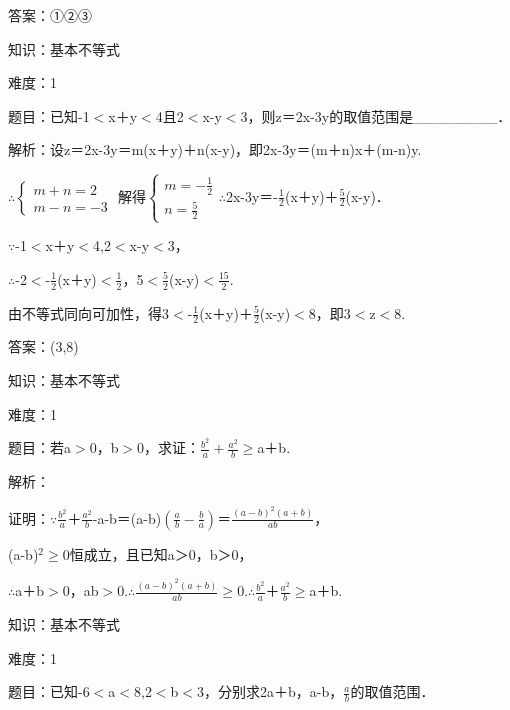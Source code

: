 \documentclass{article} %
\begin{document}
答案：①②③



知识：基本不等式

难度：1

题目：已知-1$\mathrm{<}$x＋y$\mathrm{<}$4且2$\mathrm{<}$x-y$\mathrm{<}$3，则z＝2x-3y的取值范围是\_\_\_\_\_\_\_\_．

解析：设z＝2x-3y＝m(x＋y)＋n(x-y)，即2x-3y＝(m＋n)x＋(m-n)y.

$\mathrm{\therefore}$$\left\{\begin{array}{r}
m+n=2\\
m-n=-3
\end{array} \right.$
解得$\left\{\begin{array}{r} m=-\frac{1}{2}\\ n=\frac{5}{2} \end{array}\right.
$$\mathrm{\therefore}$2x-3y＝-$\frac{1}{2}$(x＋y)＋$\frac{5}{2}$(x-y)．

$\mathrm{\because}$-1$\mathrm{<}$x＋y$\mathrm{<}$4,2$\mathrm{<}$x-y$\mathrm{<}$3，

$\mathrm{\therefore}$-2$\mathrm{<}$-$\frac{1}{2}$(x＋y)$\mathrm{<}$$\frac{1}{2}$，5$\mathrm{<}\frac{5}{2}$(x-y)$\mathrm{<}$$\frac{15}{2}$.

由不等式同向可加性，得3$\mathrm{<}$-$\frac{1}{2}$(x＋y)＋$\frac{5}{2}$(x-y)$\mathrm{<}$8，即3$\mathrm{<}$z$\mathrm{<}$8.

答案：(3,8)



知识：基本不等式

难度：1

题目：若a$\mathrm{>}$0，b$\mathrm{>}$0，求证：$\frac{b^2}{a}+\frac{a^2}{b}\mathrm{\ge}$a＋b.

解析：

证明：$\mathrm{\because}$$\frac{b^2}{a}$＋$\frac{a^2}{b}$-a-b＝(a-b)$(\frac{a}{b}-\frac{b}{a})$＝$\frac{(a-b)^2(a+b)}{ab}$，

(a-b)${}^{2}$$\mathrm{\ge}$0恒成立，且已知a＞0，b＞0，

$\mathrm{\therefore}$a＋b$\mathrm{>}$0，ab$\mathrm{>}$0.$\mathrm{\therefore}$$\frac{(a-b)^2(a+b)}{ab}$$\mathrm{\ge}$0.$\mathrm{\therefore}$$\frac{b^2}{a}$＋$\frac{a^2}{b}$$\mathrm{\ge}$a＋b.



知识：基本不等式

难度：1

题目：已知-6$\mathrm{<}$a$\mathrm{<}$8,2$\mathrm{<}$b$\mathrm{<}$3，分别求2a＋b，a-b，$\frac{a}{b}$的取值范围．
\end{document}
